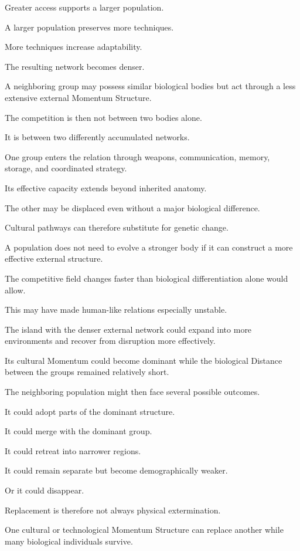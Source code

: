 Greater access supports a larger population.

A larger population preserves more techniques.

More techniques increase adaptability.

The resulting network becomes denser.

A neighboring group may possess similar biological bodies but act through a less extensive external Momentum Structure.

The competition is then not between two bodies alone.

It is between two differently accumulated networks.

One group enters the relation through weapons, communication, memory, storage, and coordinated strategy.

Its effective capacity extends beyond inherited anatomy.

The other may be displaced even without a major biological difference.

Cultural pathways can therefore substitute for genetic change.

A population does not need to evolve a stronger body if it can construct a more effective external structure.

The competitive field changes faster than biological differentiation alone would allow.

This may have made human-like relations especially unstable.

The island with the denser external network could expand into more environments and recover from disruption more effectively.

Its cultural Momentum could become dominant while the biological Distance between the groups remained relatively short.

The neighboring population might then face several possible outcomes.

It could adopt parts of the dominant structure.

It could merge with the dominant group.

It could retreat into narrower regions.

It could remain separate but become demographically weaker.

Or it could disappear.

Replacement is therefore not always physical extermination.

One cultural or technological Momentum Structure can replace another while many biological individuals survive.

